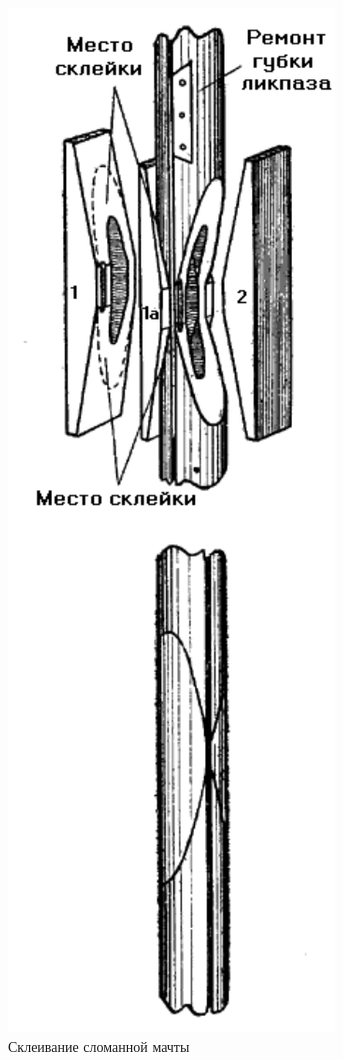 \documentclass[a4paper, 12pt, twoside, final]{scrbook}
\begin{document}
\begin{figure}
   \centering
   \includegraphics{74_Skleivanie_slom_machty} %
   \caption{Склеивание сломанной мачты}
   \label{fig:74}
\end{figure}
\end{document}
